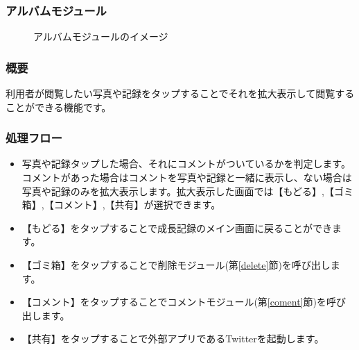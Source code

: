\documentclass[a4j]{jarticle}
\begin{document}
\subsubsection{アルバムモジュール\label{albam}}
\begin{figure}[H]
    \begin{center}
    \caption {アルバムモジュールのイメージ}
    \label{functionselection}
    \end{center}
\end{figure}

\subsubsection*{概要}
利用者が閲覧したい写真や記録をタップすることでそれを拡大表示して閲覧することができる機能です。

\subsubsection*{処理フロー}
\begin{itemize}
\item 写真や記録タップした場合、それにコメントがついているかを判定します。コメントがあった場合はコメントを写真や記録と一緒に表示し、ない場合は写真や記録のみを拡大表示します。拡大表示した画面では【もどる】,【ゴミ箱】,【コメント】,【共有】が選択できます。
\item 【もどる】をタップすることで成長記録のメイン画面に戻ることができます。
\item 【ゴミ箱】をタップすることで削除モジュール(第\ref{delete}節)を呼び出します。
\item 【コメント】をタップすることでコメントモジュール(第\ref{coment}節)を呼び出します。
\item 【共有】をタップすることで外部アプリであるTwitterを起動します。
\end{itemize}
\end{document}

